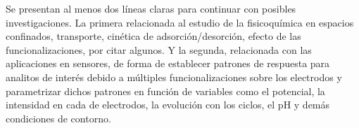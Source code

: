 Se presentan al menos dos líneas claras para continuar con posibles investigaciones. La primera relacionada al estudio de la fisicoquímica en espacios confinados, transporte, cinética de adsorción/desorción, efecto de las funcionalizaciones, por citar algunos. Y la segunda, relacionada con las aplicaciones en sensores, de forma de establecer patrones de respuesta para analitos de interés debido a múltiples funcionalizaciones sobre los electrodos y parametrizar dichos patrones en función de variables como el potencial, la intensidad en cada de electrodos, la evolución con los ciclos, el pH y demás condiciones de contorno.



























